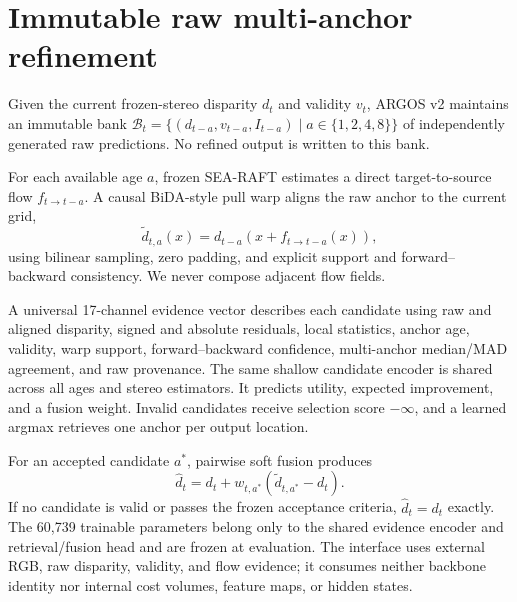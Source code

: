\section{Immutable raw multi-anchor refinement}
\label{sec:argos_method}
Given the current frozen-stereo disparity $d_t$ and validity $v_t$, ARGOS v2 maintains an immutable bank $\mathcal{B}_t=\{(d_{t-a},v_{t-a},I_{t-a})\mid a\in\{1,2,4,8\}\}$ of independently generated raw predictions.  No refined output is written to this bank.

For each available age $a$, frozen SEA-RAFT estimates a direct target-to-source flow $f_{t\rightarrow t-a}$.  A causal BiDA-style pull warp aligns the raw anchor to the current grid,
\begin{equation}
  \tilde d_{t,a}(x)=d_{t-a}\!\left(x+f_{t\rightarrow t-a}(x)\right),
\end{equation}
using bilinear sampling, zero padding, and explicit support and forward--backward consistency.  We never compose adjacent flow fields.

A universal 17-channel evidence vector describes each candidate using raw and aligned disparity, signed and absolute residuals, local statistics, anchor age, validity, warp support, forward--backward confidence, multi-anchor median/MAD agreement, and raw provenance.  The same shallow candidate encoder is shared across all ages and stereo estimators.  It predicts utility, expected improvement, and a fusion weight.  Invalid candidates receive selection score $-\infty$, and a learned argmax retrieves one anchor per output location.

For an accepted candidate $a^*$, pairwise soft fusion produces
\begin{equation}
  \hat d_t=d_t+w_{t,a^*}(\tilde d_{t,a^*}-d_t).
\end{equation}
If no candidate is valid or passes the frozen acceptance criteria, $\hat d_t=d_t$ exactly.  The 60,739 trainable parameters belong only to the shared evidence encoder and retrieval/fusion head and are frozen at evaluation.  The interface uses external RGB, raw disparity, validity, and flow evidence; it consumes neither backbone identity nor internal cost volumes, feature maps, or hidden states.
